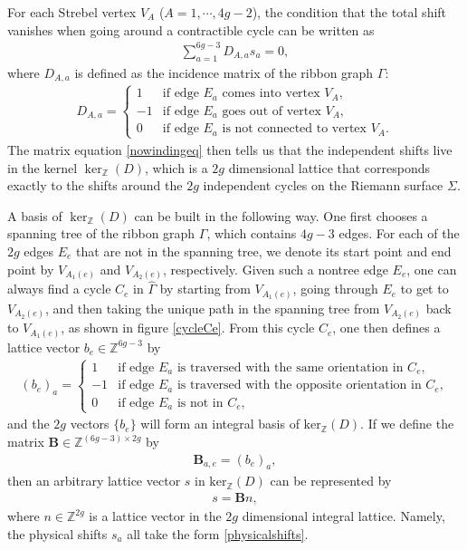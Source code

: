 \documentclass[12pt]{article}
\def\ie{\begin{equation}\begin{aligned}}
\def\fe{\end{aligned}\end{equation}}
\numberwithin{equation}{section}
\begin{document}
For each Strebel vertex $V_A$ ($A=1,\cdots, 4g-2$), the condition that the total shift vanishes when going around a contractible cycle can be written as
\ie \label{nowindingeq}
\sum_{a=1}^{6g-3} D_{A,a}s_a = 0,
\fe
where $D_{A,a}$ is defined as the incidence matrix of the ribbon graph $\Gamma$:
\ie
D_{A,a}=\begin{cases}
 1 & \text{if edge } E_a \text{ comes into vertex } V_A,\\
 -1 & \text{if edge } E_a \text{ goes out of vertex } V_A, \\
 0 & \text{if edge } E_a \text{ is not connected to vertex }V_A.
\end{cases}
\fe
The matrix equation \eqref{nowindingeq} then tells us that the independent shifts live in the kernel $\operatorname{ker}_{\mathbb{Z}}(D)$, which is a $2g$ dimensional lattice that corresponds exactly to the shifts around the $2g$ independent cycles on the Riemann surface $\Sigma$.

A basis of $\operatorname{ker}_{\mathbb{Z}}(D)$ can be built in the following way. One first chooses a spanning tree of the ribbon graph $\Gamma$, which contains $4g-3$ edges. For each of the $2g$ edges $E_e$ that are not in the spanning tree, we denote its start point and end point by $V_{A_1(e)}$ and $V_{A_2(e)}$, respectively. Given such a nontree edge $E_e$, one can always find a cycle $C_e$ in $\hat{\Gamma}$ by starting from $V_{A_1(e)}$, going through $E_e$ to get to $V_{A_2(e)}$, and then taking the unique path in the spanning tree from $V_{A_2(e)}$ back to $V_{A_1(e)}$, as shown in figure \ref{cycleCe}. From this cycle $C_e$, one then defines a lattice vector $b_e\in \mathbb{Z}^{6g-3}$ by
\ie
(b_e)_a=\begin{cases}
 1 & \text{if edge } E_a \text{ is traversed with the same orientation in } C_e,\\
 -1 & \text{if edge } E_a \text{ is traversed with the opposite orientation in } C_e,\\
 0 & \text{if edge } E_a \text{ is not in } C_e,
\end{cases}
\fe
and the $2g$ vectors $\{b_e\}$ will form an integral basis of $\text{ker}_{\mathbb{Z}}(D)$. If we define the matrix $\mathbf{B}\in \mathbb{Z}^{(6g-3)\times 2g}$ by 
\ie \label{Bmatrix}
\mathbf{B}_{a,e}=(b_e)_a,
\fe 
then an arbitrary lattice vector $s$ in $\text{ker}_{\mathbb{Z}}(D)$ can be represented by 
\ie \label{physicalshifts} s=\mathbf{B}n,\fe
where $n\in \mathbb{Z}^{2g}$ is a lattice vector in the $2g$ dimensional integral lattice. Namely, the physical shifts $s_a$ all take the form \eqref{physicalshifts}.
\end{document}
